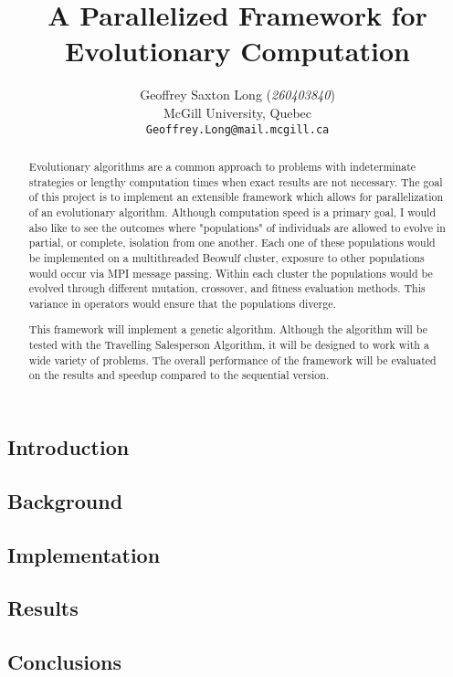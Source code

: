 \documentclass[10pt,letterpaper]{article}
\begin{document}
\title{A Parallelized Framework for Evolutionary Computation}

\author{
	Geoffrey Saxton Long (\textit{260403840})\\
	McGill University, Quebec \\
	{\tt\small Geoffrey.Long@mail.mcgill.ca}
}

\maketitle

\begin{abstract}
Evolutionary algorithms are a common approach to problems with indeterminate strategies or lengthy computation times when exact results are not necessary. The goal of this project is to implement an extensible framework which allows for parallelization of an evolutionary algorithm. Although computation speed is a primary goal, I would also like to see the outcomes where "populations" of individuals are allowed to evolve in partial, or complete, isolation from one another. Each one of these populations would be implemented on a multithreaded Beowulf cluster, exposure to other populations would occur via MPI message passing. Within each cluster the populations would be evolved through different mutation, crossover, and fitness evaluation methods. This variance in operators would ensure that the populations diverge. 

This framework will implement a genetic algorithm. Although the algorithm will be tested with the Travelling Salesperson Algorithm, it will be designed to work with a wide variety of problems. The overall performance of the framework will be evaluated on the results and speedup compared to the sequential version. 
\end{abstract}



\subsection{Introduction}



\subsection{Background}

\subsection{Implementation}

\subsection{Results}

\subsection{Conclusions}
\end{document}

